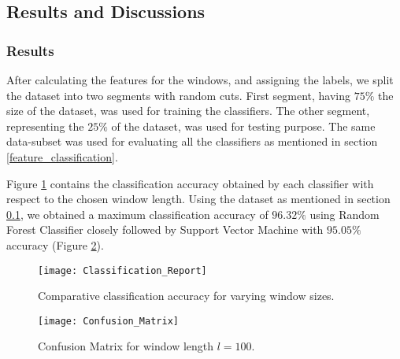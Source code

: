 \documentclass[
10pt,           %
a4paper,        %
oneside,        %
headinclude,footinclude, %
]{scrartcl}
\begin{document}
\subsection{Results and Discussions}
\label{results}
\subsubsection{Results}

After calculating the features for the windows, and assigning the labels, we split the dataset into two segments with random cuts. First segment, having $75\%$ the size of the dataset, was used for training the classifiers. The other segment, representing the $25\%$ of the dataset, was used for testing purpose. The same data-subset was used for evaluating all the classifiers as mentioned in section \ref{feature_classification}.

Figure \ref{cls_rpt} contains the classification accuracy obtained by each classifier with respect to the chosen window length. Using the dataset as mentioned in section \ref{results}, we obtained a maximum classification accuracy of $96.32\%$ using Random Forest Classifier closely followed by Support Vector Machine with $95.05\%$ accuracy (Figure \ref{cm_fig}).

\begin{figure}[h]
  \centering
  \begin{center}
    \texttt{[image: Classification\_Report]}
  \end{center}
  \vspace{-10pt}
  \caption{\label{cls_rpt}Comparative classification accuracy for varying window sizes.}
  \vspace{10pt}
\end{figure}

\begin{figure}[h]
  \centering
  \begin{center}
    \texttt{[image: Confusion\_Matrix]}
  \end{center}
  \vspace{-10pt}
  \caption{\label{cm_fig}Confusion Matrix for window length $l=100$.}
\end{figure}
\end{document}
